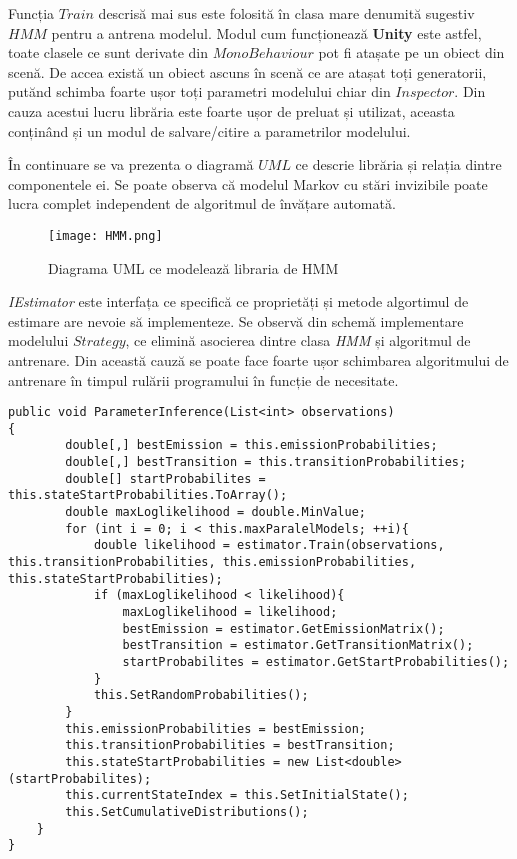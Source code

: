 Funcția $Train$ descrisă mai sus este folosită în clasa mare denumită sugestiv $HMM$ pentru a antrena modelul. Modul cum funcționează \textbf{Unity} este astfel, toate clasele ce sunt derivate din $MonoBehaviour$ pot fi atașate pe un obiect din scenă. De accea există un obiect ascuns în scenă ce are atașat toți generatorii, putănd schimba foarte ușor toți parametri modelului chiar din $Inspector$. Din cauza acestui lucru librăria este foarte ușor de preluat și utilizat, aceasta conținând și un modul de salvare/citire a parametrilor modelului.\par

În continuare se va prezenta o diagramă $UML$ ce descrie librăria și relația dintre componentele ei. Se poate observa că modelul Markov cu stări invizibile poate lucra complet independent de algoritmul de învățare automată.\par

\vspace{10mm}
\begin{figure}[H]
\centering
\texttt{[image: HMM.png]} \par
\caption{Diagrama UML ce modelează libraria de HMM}
\end{figure}

\textit{IEstimator} este interfața ce specifică ce proprietăți și metode algortimul de estimare are nevoie să implementeze. Se observă din schemă implementare modelului $Strategy$, ce elimină asocierea dintre clasa \textit{HMM} și algoritmul de antrenare. Din această cauză se poate face foarte ușor schimbarea algoritmului de antrenare în timpul rulării programului în funcție de necesitate.\par

\begin{lstlisting}[caption=Folosirea funcție $Train$ în cadrul modelului]
public void ParameterInference(List<int> observations)
{
        double[,] bestEmission = this.emissionProbabilities;
        double[,] bestTransition = this.transitionProbabilities;
        double[] startProbabilites = this.stateStartProbabilities.ToArray();
        double maxLoglikelihood = double.MinValue;
        for (int i = 0; i < this.maxParalelModels; ++i){
            double likelihood = estimator.Train(observations, this.transitionProbabilities, this.emissionProbabilities, this.stateStartProbabilities);
            if (maxLoglikelihood < likelihood){
                maxLoglikelihood = likelihood;
                bestEmission = estimator.GetEmissionMatrix();
                bestTransition = estimator.GetTransitionMatrix();
                startProbabilites = estimator.GetStartProbabilities();
            }
            this.SetRandomProbabilities();
        }
        this.emissionProbabilities = bestEmission;
        this.transitionProbabilities = bestTransition;
        this.stateStartProbabilities = new List<double>(startProbabilites);
        this.currentStateIndex = this.SetInitialState();
        this.SetCumulativeDistributions();
    }
}
\end{lstlisting}

